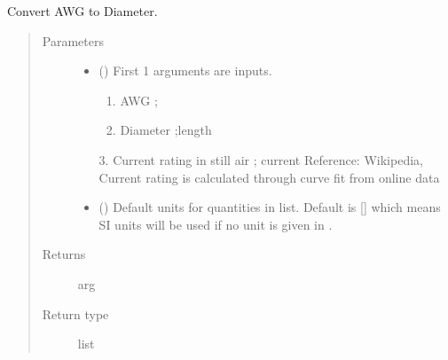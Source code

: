 \documentclass[letterpaper,10pt,english]{sphinxmanual}
\begin{document}
\begin{fulllineitems}
\label{\detokenize{components:components.AWG2Dia}}
Convert AWG to Diameter.
\begin{quote}\begin{description}
\item[{Parameters}] \leavevmode\begin{itemize}
\item {} 
 () \textendash{} 
First 1 arguments are inputs.
\begin{enumerate}
%
\item {} 
AWG ;

\item {} 
Diameter ;length

\end{enumerate}

3. Current rating in still air ; current
Reference:  Wikipedia, Current rating is calculated through curve fit from online data


\item {} 
 (\sphinxstyleliteralemphasis{\sphinxupquote{, }}) \textendash{} Default units for quantities in  list. Default is {[}{]} which means SI units will be used if no unit is given in .

\end{itemize}

\item[{Returns}] \leavevmode
arg

\item[{Return type}] \leavevmode
list

\end{description}\end{quote}

\end{fulllineitems}

\end{document}
